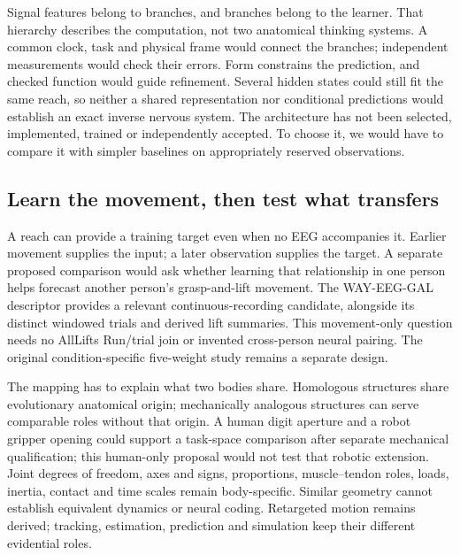 Signal features belong to branches, and branches belong to the learner.
That hierarchy describes the computation, not two anatomical thinking systems.
A common clock, task and physical frame would connect the branches; independent
measurements would check their errors. Form constrains the prediction, and
checked function would guide refinement. Several hidden states could still
fit the same reach, so neither a shared representation nor conditional
predictions would establish an exact inverse nervous system. The architecture
has not been selected, implemented, trained or independently accepted.
To choose it, we would have to compare it with simpler baselines on
appropriately reserved observations.

\subsection{Learn the movement, then test what transfers}

A reach can provide a training target even when no EEG accompanies it. Earlier movement supplies the input; a later observation supplies the target. A separate proposed comparison would ask whether learning that relationship in one person helps forecast another person's grasp-and-lift movement. The WAY-EEG-GAL descriptor provides a relevant continuous-recording candidate, alongside its distinct windowed trials and derived lift summaries.\citep{luciw2014way} This movement-only question needs no AllLifts Run/trial join or invented cross-person neural pairing. The original condition-specific five-weight study remains a separate design.

The mapping has to explain what two bodies share. Homologous structures share evolutionary anatomical origin; mechanically analogous structures can serve comparable roles without that origin. A human digit aperture and a robot gripper opening could support a task-space comparison after separate mechanical qualification; this human-only proposal would not test that robotic extension. Joint degrees of freedom, axes and signs, proportions, muscle--tendon roles, loads, inertia, contact and time scales remain body-specific. Similar geometry cannot establish equivalent dynamics or neural coding. Retargeted motion remains derived; tracking, estimation, prediction and simulation keep their different evidential roles.

